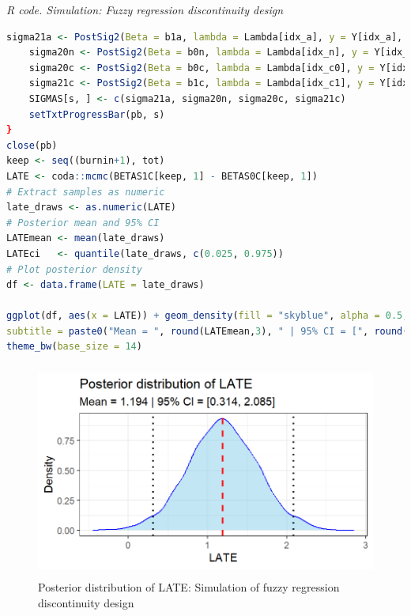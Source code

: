 \begin{tcolorbox}[enhanced,width=4.67in,center upper,
	fontupper=\large\bfseries,drop shadow southwest,sharp corners]
	\textit{R code. Simulation: Fuzzy regression discontinuity design}
	\begin{VF}
		\begin{lstlisting}[language=R]	
	sigma21a <- PostSig2(Beta = b1a, lambda = Lambda[idx_a], y = Y[idx_a], H = W[idx_a,])
	sigma20n <- PostSig2(Beta = b0n, lambda = Lambda[idx_n], y = Y[idx_n], H = W[idx_n,])
	sigma20c <- PostSig2(Beta = b0c, lambda = Lambda[idx_c0], y = Y[idx_c0], H = Wc[idx_c0,])
	sigma21c <- PostSig2(Beta = b1c, lambda = Lambda[idx_c1], y = Y[idx_c1], H = Wc[idx_c1,])
	SIGMAS[s, ] <- c(sigma21a, sigma20n, sigma20c, sigma21c)
	setTxtProgressBar(pb, s)
}
close(pb)
keep <- seq((burnin+1), tot)
LATE <- coda::mcmc(BETAS1C[keep, 1] - BETAS0C[keep, 1])
# Extract samples as numeric
late_draws <- as.numeric(LATE)
# Posterior mean and 95% CI
LATEmean <- mean(late_draws)
LATEci   <- quantile(late_draws, c(0.025, 0.975))
# Plot posterior density
df <- data.frame(LATE = late_draws)

ggplot(df, aes(x = LATE)) + geom_density(fill = "skyblue", alpha = 0.5, color = "blue") + geom_vline(xintercept = LATEmean, color = "red", linetype = "dashed", linewidth = 1) + geom_vline(xintercept = LATEci, color = "black", linetype = "dotted", linewidth = 1) + labs(title = "Posterior distribution of LATE",
subtitle = paste0("Mean = ", round(LATEmean,3), " | 95% CI = [", round(LATEci[1],3), ", ", round(LATEci[2],3), "]"), x = "LATE", y = "Density") +
theme_bw(base_size = 14)
		\end{lstlisting}
	\end{VF}
\end{tcolorbox}  

\begin{figure}[h!]
	\includegraphics[width=340pt, height=200pt]{Chapters/chapter12/figures/FigFRD.png}
	\caption[List of figure caption goes here]{Posterior distribution of LATE: Simulation of fuzzy regression discontinuity design}\label{fig12_FRD}
\end{figure}


